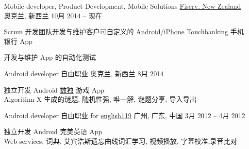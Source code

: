 
\begin{cventries}
	\cventry
	{Mobile developer, Product Development, Mobile Solutions}
	{\href{https://www.careers.fiserv.com/new-zealand}{Fiserv. New Zealand}}
	{奥克兰, \enskip 新西兰}
	{10月 2014 – 现在}
	{
		\begin{cvitems}
			\item {Scrum 开发团队开发与维护客户可自定义的 \href{https://play.google.com/store/apps/details?id=com.fiserv.touchbankingasp&hl=en}{Android}/\href{https://itunes.apple.com/us/app/touchbanking/id386678211?mt=8}{iPhone} Touchbanking 手机银行 App}
			\item {开发与维护 App 的自动化测试}
		\end{cvitems}
	}
\end{cventries}

\begin{cventries}
	\cventry
	{Android developer}
	{自由职业}
	{奥克兰, \enskip 新西兰}
	{8月 2014}
	{
		\begin{cvitems}
			\item {独立开发 Android \href{https://play.google.com/store/apps/details?id=com.gmail.jiangyang5157.sudoku}{数独} 游戏 App\\
			Algorithm X 生成的谜题, 随机性强, 唯一解, 谜题分享, 导入导出}
		\end{cvitems}
	}
\end{cventries}

\begin{cventries}
	\cventry
	{Android developer}
	{自由职业 for \href{http://www.english119.cn}{english119}}
	{广州, \enskip 广东, \enskip 中国}
	{3月 2012 – 4月 2012}
	{
		\begin{cvitems}
			\item {独立开发 Android 完美英语 App\\
				Web services, 词典, 艾宾浩斯遗忘曲线词汇学习, 视频播放, 字幕校准,录音比对}
		\end{cvitems}
	}
\end{cventries}

